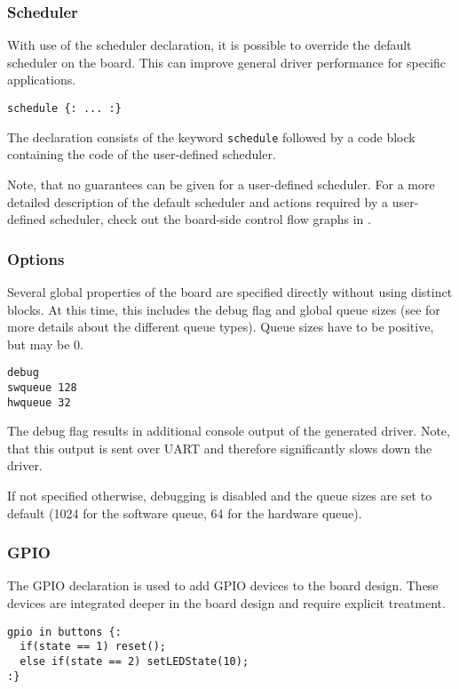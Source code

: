 \documentclass{report}
\begin{document}
\subsubsection{Scheduler}
With use of the scheduler declaration, it is possible to override the default scheduler on the board. This can improve general driver performance for specific applications.

\begin{lstlisting}[language=bdl]
schedule {: ... :}
\end{lstlisting}

The declaration consists of the keyword \texttt{schedule} followed by a code block containing the code of the user-defined scheduler.

Note, that no guarantees can be given for a user-defined scheduler. For a more detailed description of the default scheduler and actions required by a user-defined scheduler, check out the board-side control flow graphs in .

\subsubsection{Options}
Several global properties of the board are specified directly without using distinct blocks. At this time, this includes the debug flag and global queue sizes (see  for more details about the different queue types). Queue sizes have to be positive, but may be 0.

\begin{lstlisting}[language=bdl]
debug
swqueue 128
hwqueue 32
\end{lstlisting}

The debug flag results in additional console output of the generated driver. Note, that this output is sent over UART and therefore significantly slows down the driver.

If not specified otherwise, debugging is disabled and the queue sizes are set to default (1024 for the software queue, 64 for the hardware queue).

\subsubsection{GPIO}
The GPIO declaration is used to add GPIO devices to the board design. These devices are integrated deeper in the board design and require explicit treatment.

\begin{lstlisting}[language=bdl]
gpio in buttons {:
  if(state == 1) reset();
  else if(state == 2) setLEDState(10);
:}
\end{lstlisting}
\end{document}
